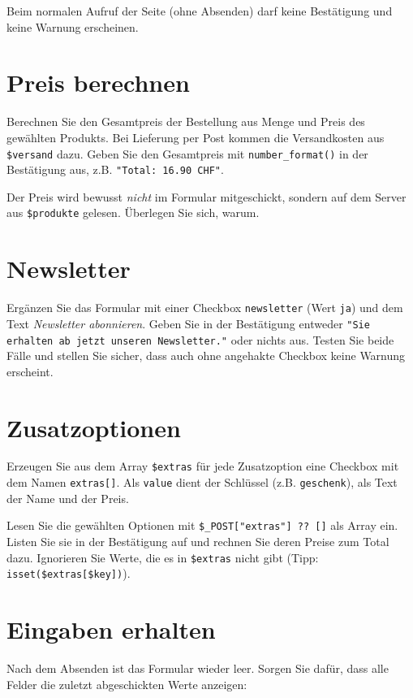 \documentclass[a4paper,12pt]{article}
\begin{document}
Beim normalen Aufruf der Seite (ohne Absenden) darf keine Bestätigung und keine Warnung erscheinen.

\section{Preis berechnen}

Berechnen Sie den Gesamtpreis der Bestellung aus Menge und Preis des gewählten Produkts. Bei Lieferung per Post kommen die Versandkosten aus \texttt{\$versand} dazu. Geben Sie den Gesamtpreis mit \texttt{number\_format()} in der Bestätigung aus, z.B. \texttt{"{}Total: 16.90 CHF"{}}.

Der Preis wird bewusst \emph{nicht} im Formular mitgeschickt, sondern auf dem Server aus \texttt{\$produkte} gelesen. Überlegen Sie sich, warum.

\section{Newsletter}

Ergänzen Sie das Formular mit einer Checkbox \texttt{newsletter} (Wert \texttt{ja}) und dem Text \emph{Newsletter abonnieren}. Geben Sie in der Bestätigung entweder \texttt{"{}Sie erhalten ab jetzt unseren Newsletter."{}} oder nichts aus. Testen Sie beide Fälle und stellen Sie sicher, dass auch ohne angehakte Checkbox keine Warnung erscheint.

\section{Zusatzoptionen}

Erzeugen Sie aus dem Array \texttt{\$extras} für jede Zusatzoption eine Checkbox mit dem Namen \texttt{extras[]}. Als \texttt{value} dient der Schlüssel (z.B. \texttt{geschenk}), als Text der Name und der Preis.

Lesen Sie die gewählten Optionen mit \texttt{\$\_POST["{}extras"{}] ?? []} als Array ein. Listen Sie sie in der Bestätigung auf und rechnen Sie deren Preise zum Total dazu. Ignorieren Sie Werte, die es in \texttt{\$extras} nicht gibt (Tipp: \texttt{isset(\$extras[\$key])}).

\section{Eingaben erhalten}

Nach dem Absenden ist das Formular wieder leer. Sorgen Sie dafür, dass alle Felder die zuletzt abgeschickten Werte anzeigen:
\end{document}
